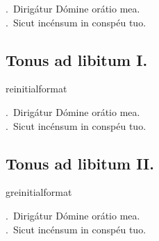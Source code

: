 \documentclass[12pt]{article} %
\newcommand{\myaboveinitial}[1]{%
    \expandafter\renewcommand\csname greinitialformat\endcsname[1]{%
        \fontsize{43}{43}\selectfont ##1
    }
    \gresetfirstlineaboveinitial{\textcolor{benred8}{\raisebox{6.0mm}{\small \textsc{\textbf{#1}}}}}{}
}
\newenvironment{response}{\leftskip 0in \setlength{\parindent}{0in}}{\vspace{1 mm}}
\let\oldVbar\Vbar
\renewcommand{\Vbar}{\textcolor{benred8}{\oldVbar .}}
\let\oldRbar\Rbar
\renewcommand{\Rbar}{\textcolor{benred8}{\oldRbar .}}
\begin{document}
\begin{pages}
\begin{Leftside}
\pend\pstart

\begin{response}
\Vbar\ Dirig\'{a}tur D\'{o}mine or\'{a}tio mea.\\
\Rbar\ Sicut inc\'{e}nsum in consp\'{e}u tuo.

\end{response}

\pend\pstart


\subsection*{Tonus ad libitum I.}

\pend\pstart

\myaboveinitial{VIII}

\pend\pstart

\begin{response}
\Vbar\ Dirig\'{a}tur D\'{o}mine or\'{a}tio mea.\\
\Rbar\ Sicut inc\'{e}nsum in consp\'{e}u tuo.

\end{response}

\pend\pstart


\subsection*{Tonus ad libitum II.}

\pend\pstart


\myaboveinitial{I}

\pend\pstart

\begin{response}
\Vbar\ Dirig\'{a}tur D\'{o}mine or\'{a}tio mea.\\
\Rbar\ Sicut inc\'{e}nsum in consp\'{e}u tuo.

\end{response}

\pend\endnumbering
\end{Leftside}
\begin{Rightside}


\end{Rightside}
\end{pages}
\end{document}
